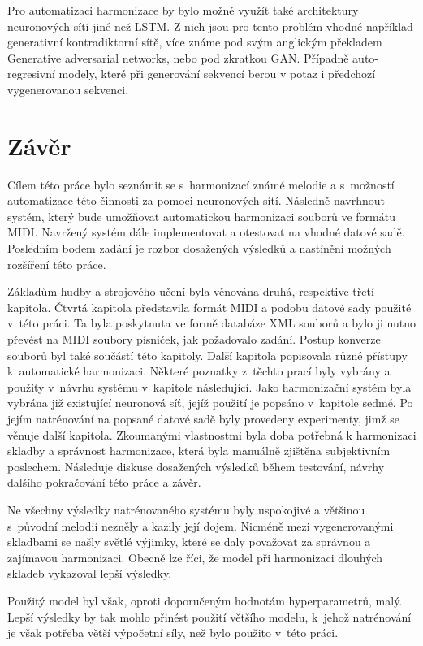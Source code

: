 Pro automatizaci harmonizace by bylo možné 
využít také architektury neuronových sítí
jiné než LSTM.
Z nich jsou pro tento problém vhodné například
generativní kontradiktorní sítě, 
více známe pod svým anglickým překladem 
Generative adversarial networks,
nebo pod zkratkou GAN.
Případně auto-regresivní modely,
které při generování sekvencí berou v potaz i předchozí vygenerovanou sekvenci. 


\chapter{Závěr}
\label{zaver}
Cílem této práce bylo seznámit se s~harmonizací známé melodie a 
s~možností automatizace této činnosti za pomoci neuronových sítí.
Následně navrhnout systém, který bude umožňovat automatickou harmonizaci 
souborů ve formátu MIDI.
Navržený systém dále implementovat a otestovat na vhodné datové sadě.
Posledním bodem zadání je rozbor dosažených výsledků 
a nastínění možných rozšíření této práce.
\par
Základům hudby a strojového učení byla věnována druhá,
respektive třetí kapitola.
Čtvrtá kapitola představila formát MIDI 
a podobu datové sady použité v~této práci.
Ta byla poskytnuta ve formě databáze XML souborů 
a bylo ji nutno převést na MIDI soubory písniček, 
jak požadovalo zadání.
Postup konverze souborů byl také součástí této kapitoly.
Další kapitola popisovala různé přístupy k~automatické harmonizaci. 
Některé poznatky z~těchto prací byly vybrány 
a použity v~návrhu systému v~kapitole následující.
Jako harmonizační systém byla vybrána již existující neuronová síť,
jejíž použití je popsáno v~kapitole sedmé.
Po jejím natrénování na popsané datové sadě byly provedeny experimenty,
jimž se věnuje další kapitola.
Zkoumanými vlastnostmi byla doba potřebná k harmonizaci skladby
a správnost harmonizace,
která byla manuálně zjištěna subjektivním poslechem.
Následuje diskuse dosažených výsledků během testování,
návrhy dalšího pokračování této práce a závěr.
\par

Ne všechny výsledky natrénovaného systému byly uspokojivé
a většinou s~původní melodií nezněly a kazily její dojem.
Nicméně mezi vygenerovanými skladbami se našly světlé výjimky,
které se daly považovat za správnou a zajímavou harmonizaci.
Obecně lze říci, že model při harmonizaci dlouhých skladeb
vykazoval lepší výsledky.

Použitý model byl však, oproti doporučeným hodnotám hyperparametrů, malý.
Lepší výsledky by tak mohlo přinést použití většího modelu,
k~jehož natrénování je však potřeba větší výpočetní síly, 
než bylo použito v~této práci.
